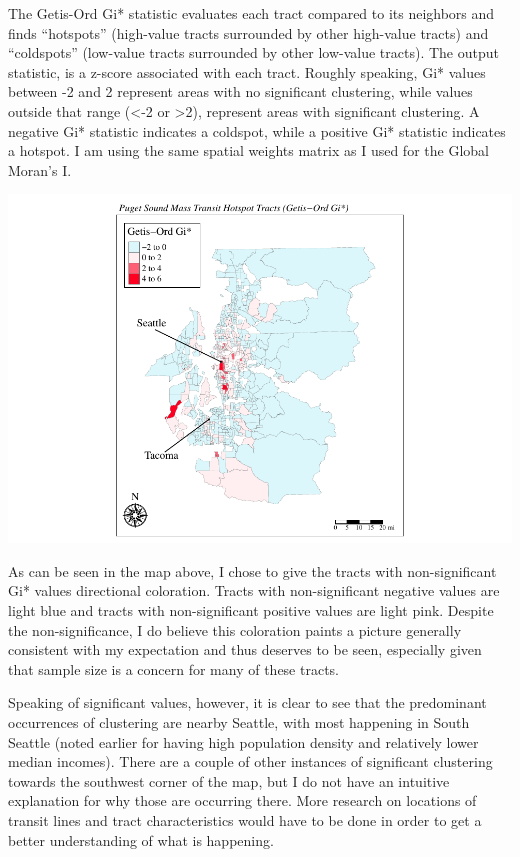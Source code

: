 \documentclass[
]{article}
\begin{document}
The Getis-Ord Gi* statistic evaluates each tract compared to its
neighbors and finds ``hotspots'' (high-value tracts surrounded by other
high-value tracts) and ``coldspots'' (low-value tracts surrounded by
other low-value tracts). The output statistic, is a z-score associated
with each tract. Roughly speaking, Gi* values between -2 and 2 represent
areas with no significant clustering, while values outside that range
(\textless-2 or \textgreater2), represent areas with significant
clustering. A negative Gi* statistic indicates a coldspot, while a
positive Gi* statistic indicates a hotspot. I am using the same spatial
weights matrix as I used for the Global Moran's I.

\includegraphics{transit-hotspots-PSRC_files/figure-latex/unnamed-chunk-12-1.pdf}

As can be seen in the map above, I chose to give the tracts with
non-significant Gi* values directional coloration. Tracts with
non-significant negative values are light blue and tracts with
non-significant positive values are light pink. Despite the
non-significance, I do believe this coloration paints a picture
generally consistent with my expectation and thus deserves to be seen,
especially given that sample size is a concern for many of these tracts.

Speaking of significant values, however, it is clear to see that the
predominant occurrences of clustering are nearby Seattle, with most
happening in South Seattle (noted earlier for having high population
density and relatively lower median incomes). There are a couple of
other instances of significant clustering towards the southwest corner
of the map, but I do not have an intuitive explanation for why those are
occurring there. More research on locations of transit lines and tract
characteristics would have to be done in order to get a better
understanding of what is happening.
\end{document}
